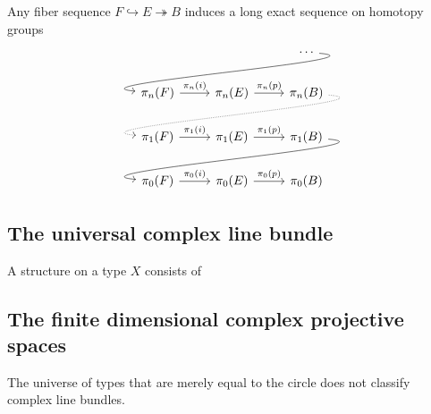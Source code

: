 \begin{thm}
Any fiber sequence $F\hookrightarrow E\twoheadrightarrow B$ induces a long exact sequence on homotopy groups
\begin{equation*}
\begin{tikzcd}
& & \cdots \arrow[out=355,in=175,dll] \\
\pi_n(F) \arrow[r,"\pi_n(i)"] & \pi_n(E) \arrow[r,"\pi_n(p)"] & \pi_n(B) \arrow[out=355,in=175,dll,densely dotted] \\
\pi_1(F) \arrow[r,"\pi_1(i)"] & \pi_1(E) \arrow[r,"\pi_1(p)"] & \pi_1(B) \arrow[out=355,in=175,dll] \\
\pi_0(F) \arrow[r,"\pi_0(i)"] & \pi_0(E) \arrow[r,"\pi_0(p)"] & \pi_0(B)
\end{tikzcd}
\end{equation*}
\end{thm}

\subsection{The universal complex line bundle}

\begin{defn}
  A  structure on a type $X$ consists of 
\end{defn}


\subsection{The finite dimensional complex projective spaces}

\begin{rmk}
  The universe of types that are merely equal to the circle does not classify complex line bundles.
\end{rmk}



